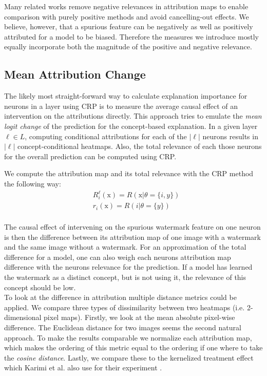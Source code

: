 Many related works remove negative relevances in attribution maps to enable comparison with purely positive methods and avoid cancelling-out effects. We believe, however, that a spurious feature can be negatively as well as positively attributed for a model to be biased. Therefore the measures we introduce mostly equally incorporate both the magnitude of the positive and negative relevance. 

\subsection{Mean Attribution Change}
The likely most straight-forward way to calculate explanation importance for neurons in a layer using CRP is to measure the average causal effect of an intervention on the attributions directly. This approach tries to emulate the \textit{mean logit change} of the prediction for the concept-based explanation. In a given layer $\ell \in L$, computing conditional attributions for each of the $|\ell|$ neurons results in $|\ell|$ concept-conditional heatmaps. Also, the total relevance of each those neurons for the overall prediction can be computed using CRP.

We compute the attribution map and its total relevance with the CRP method the following way:
\begin{align*}
& R_i^{\ell}(\mathrm{x}) = R(\mathrm{x} | \theta=\{i, y\}) \\
& r_i(\mathrm{x}) = R(i | \theta=\{y\}) \\
\end{align*}

The causal effect of intervening on the spurious watermark feature on one neuron is then the difference between its attribution map of one image with a watermark and the same image without a watermark. For an approximation of the total difference for a model, one can also weigh each neurons attribution map difference with the neurons relevance for the prediction. If a model has learned the watermark as a distinct concept, but is not using it, the relevance of this concept should be low. \\

To look at the difference in attribution multiple distance metrics could be applied. We compare three types of dissimilarity between two heatmaps (i.e. 2-dimensional pixel maps). Firstly, we look at the mean absolute pixel-wise difference. The Euclidean distance for two images seems the second natural approach. To make the results comparable we normalize each attribution map, which makes the ordering of this metric equal to the ordering if one where to take the \textit{cosine distance}.
Lastly, we compare these to the kernelized treatment effect which Karimi et al. also use for their experiment \cite{Karimi2023}. \\ 



